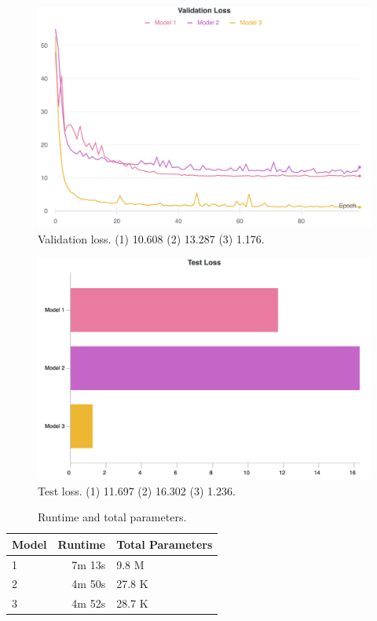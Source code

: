 \documentclass[twocolumn]{article}
\begin{document}
\begin{figure}
    \centering
    \includegraphics[width=\linewidth]{Figures/val-loss.png}
    \caption{Validation loss. (1) 10.608 (2) 13.287 (3) 1.176.}
    \label{fig:val-loss}
\end{figure}

\begin{figure}
    \centering
    \includegraphics[width=\linewidth]{Figures/test-loss.png}
    \caption{Test loss. (1) 11.697 (2) 16.302 (3) 1.236.}
    \label{fig:test-loss}
\end{figure}

\begin{table}
    \centering
    \caption{Runtime and total parameters.}
    \label{tab:properties}
    \begin{tabular}{lrl}
    \toprule
    Model &         Runtime & Total Parameters \\
    \midrule
    1 & 7m 13s &            9.8 M \\
    2 & 4m 50s &           27.8 K \\
    3 & 4m 52s &           28.7 K \\
    \bottomrule
    \end{tabular}
    \end{table}
\end{document}
